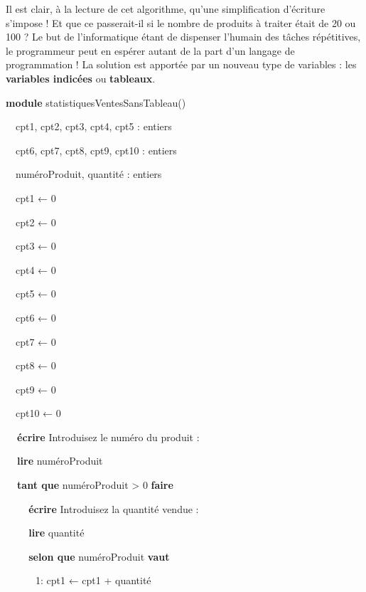 {
Il est clair, à la lecture de cet algorithme, qu’une simplification
d’écriture s’impose ! Et que ce passerait-il si le nombre de produits à
traiter était de 20 ou 100 ? Le but de l’informatique étant de
dispenser l’humain des tâches répétitives, le programmeur peut en
espérer autant de la part d’un langage de programmation ! La solution
est apportée par un nouveau type de variables : les \textbf{variables
indicées} ou \textbf{tableaux}.}

{\sffamily
\textbf{module} statistiquesVentesSansTableau()}


\bigskip

{\sffamily
\ \ cpt1, cpt2, cpt3, cpt4, cpt5 : entiers}

{\sffamily
\ \ cpt6, cpt7, cpt8, cpt9, cpt10 : entiers}

{\sffamily
\ \ numéroProduit, quantité : entiers}


\bigskip

{\sffamily
\ \ cpt1 ← 0}

{\sffamily
\ \ cpt2 ← 0}

{\sffamily
\ \ cpt3 ← 0}

{\sffamily
\ \ cpt4 ← 0}

{\sffamily
\ \ cpt5 ← 0}

{\sffamily
\ \ cpt6 ← 0}

{\sffamily
\ \ cpt7 ← 0}

{\sffamily
\ \ cpt8 ← 0}

{\sffamily
\ \ cpt9 ← 0}

{\sffamily
\ \ cpt10 ← 0}


\bigskip

{\sffamily
\textbf{\ \ écrire} {\textquotedbl}Introduisez le numéro du produit :
{\textquotedbl}}

{\sffamily
\textbf{\ \ lire} numéroProduit}


\bigskip

{\sffamily
\textbf{\ \ tant que} numéroProduit {\textgreater} 0 \textbf{faire}}


\bigskip

{\sffamily
\textbf{\ \ \ \ écrire} {\textquotedbl}Introduisez la quantité vendue :
{\textquotedbl}}

{\sffamily
\textbf{\ \ \ \ lire} quantité}


\bigskip

{\sffamily
\textbf{\ \ \ \ selon que} numéroProduit \textbf{vaut}}

{\sffamily
\ \ \ \ \ \ 1: cpt1 ← cpt1 + quantité}

